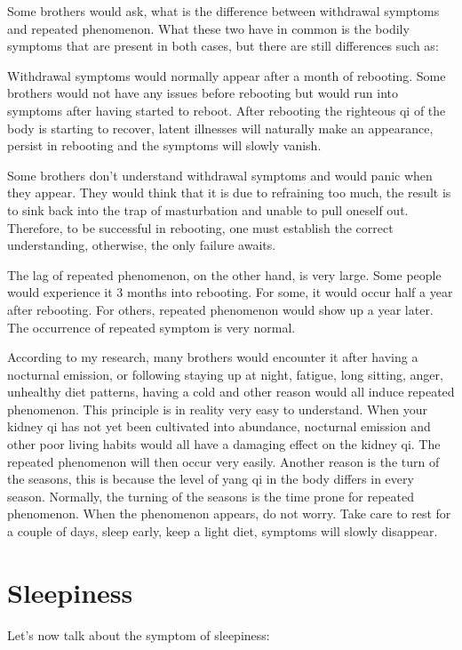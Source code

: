 \documentclass[
]{book}
\begin{document}
Some brothers would ask, what is the difference between withdrawal symptoms and repeated phenomenon. What these two have in common is the bodily symptoms that are present in both cases, but there are still differences such as:

Withdrawal symptoms would normally appear after a month of rebooting. Some brothers would not have any issues before rebooting but would run into symptoms after having started to reboot. After rebooting the righteous qi of the body is starting to recover, latent illnesses will naturally make an appearance, persist in rebooting and the symptoms will slowly vanish.

Some brothers don't understand withdrawal symptoms and would panic when they appear. They would think that it is due to refraining too much, the result is to sink back into the trap of masturbation and unable to pull oneself out. Therefore, to be successful in rebooting, one must establish the correct understanding, otherwise, the only failure awaits.

The lag of repeated phenomenon, on the other hand, is very large. Some people would experience it 3 months into rebooting. For some, it would occur half a year after rebooting. For others, repeated phenomenon would show up a year later. The occurrence of repeated symptom is very normal.

According to my research, many brothers would encounter it after having a nocturnal emission, or following staying up at night, fatigue, long sitting, anger, unhealthy diet patterns, having a cold and other reason would all induce repeated phenomenon. This principle is in reality very easy to understand. When your kidney qi has not yet been cultivated into abundance, nocturnal emission and other poor living habits would all have a damaging effect on the kidney qi. The repeated phenomenon will then occur very easily. Another reason is the turn of the seasons, this is because the level of yang qi in the body differs in every season. Normally, the turning of the seasons is the time prone for repeated phenomenon. When the phenomenon appears, do not worry. Take care to rest for a couple of days, sleep early, keep a light diet, symptoms will slowly disappear.

\hypertarget{sleepiness}{%
\section{Sleepiness}\label{sleepiness}}

Let's now talk about the symptom of sleepiness:
\end{document}
